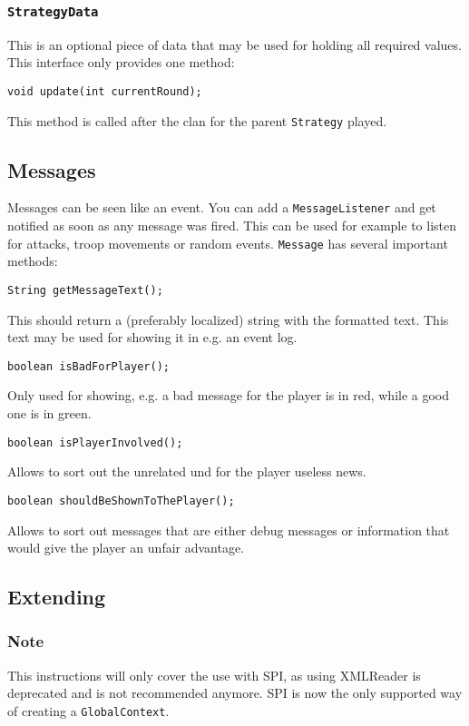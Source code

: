 \documentclass{article}
\begin{document}
\subsubsection{\texttt{StrategyData}}
This is an optional piece of data that may be used for holding all required values. This interface only provides one method:
\begin{verbatim}
void update(int currentRound);
\end{verbatim}
This method is called after the clan for the parent \texttt{Strategy} played.

\subsection{Messages}
Messages can be seen like an event. You can add a \texttt{MessageListener} and get notified as soon as any message was fired. This can be used for example to listen for attacks, troop movements or random events.
\texttt{Message} has several important methods:
\begin{verbatim}
String getMessageText();
\end{verbatim}
This should return a (preferably localized) string with the formatted text. This text may be used for showing it in e.g. an event log.
\begin{verbatim}
boolean isBadForPlayer();
\end{verbatim}
Only used for showing, e.g. a bad message for the player is in red, while a good one is in green.
\begin{verbatim}
boolean isPlayerInvolved();
\end{verbatim}
Allows to sort out the unrelated und for the player useless news.
\begin{verbatim}
boolean shouldBeShownToThePlayer();
\end{verbatim}
Allows to sort out messages that are either debug messages or information that would give the player an unfair advantage.
\newpage


\subsection{Extending}
\subsubsection{Note}
This instructions will only cover the use with SPI, as using XMLReader is deprecated and is not recommended anymore.\newline
SPI is now the only supported way of creating a \texttt{GlobalContext}.
\end{document}
